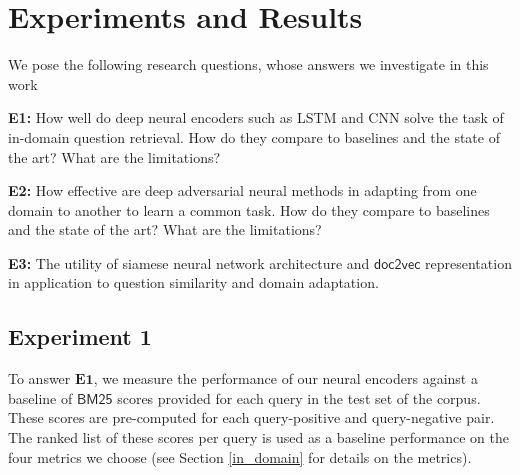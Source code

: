\documentclass{sigkddExp}
\begin{document}
    
   


\section{Experiments and Results}
\label{experiments}
We pose the following research questions, whose answers we investigate in this work
\begin{itemize}[topsep=0pt,itemsep=-1ex,partopsep=1ex,parsep=1ex]
\item \textbf{E1:} How well do deep neural encoders {\color{red} such as LSTM and CNN solve the task of in-domain question retrieval. How do they compare to baselines and the state of the art? What are the limitations?}
\item \textbf{E2:} How effective are deep adversarial neural methods in adapting from one domain to another to learn a common task. {\color{red}How do they compare to baselines and the state of the art?} What are the limitations?
{\color{red}
\item \textbf{E3:} The utility of siamese neural network architecture and $\mathsf{doc2vec}$ representation in application to question similarity and domain adaptation.
}
\end{itemize}

\subsection{Experiment 1}
To answer $\mathbf{E1}$, we measure the performance of our neural encoders against a baseline of $\mathsf{BM25}$ scores provided for each query in the test set of the corpus. These scores are pre-computed for each query-positive and query-negative pair. The ranked list of these scores per query is used as a baseline performance on the four metrics we choose (see Section \ref{in_domain} for details on the metrics).
\end{document}

